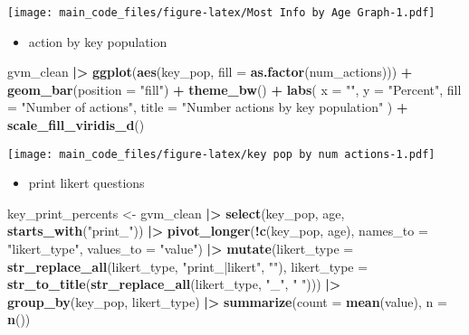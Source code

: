 \documentclass[
]{article}
\newenvironment{Shaded}{\begin{snugshade}}{\end{snugshade}}
\newcommand{\AttributeTok}[1]{\textcolor[rgb]{0.13,0.29,0.53}{#1}}
\newcommand{\FunctionTok}[1]{\textcolor[rgb]{0.13,0.29,0.53}{\textbf{#1}}}
\newcommand{\NormalTok}[1]{#1}
\newcommand{\OtherTok}[1]{\textcolor[rgb]{0.56,0.35,0.01}{#1}}
\newcommand{\SpecialCharTok}[1]{\textcolor[rgb]{0.81,0.36,0.00}{\textbf{#1}}}
\newcommand{\StringTok}[1]{\textcolor[rgb]{0.31,0.60,0.02}{#1}}
\providecommand{\tightlist}{%
  \setlength{\itemsep}{0pt}\setlength{\parskip}{0pt}}
\begin{document}
\texttt{[image: main\_code\_files/figure-latex/Most Info by Age Graph-1.pdf]}

\begin{itemize}
\tightlist
\item
  action by key population
\end{itemize}

\begin{Shaded}
\begin{Highlighting}[]
\NormalTok{gvm\_clean }\SpecialCharTok{|\textgreater{}}
  \FunctionTok{ggplot}\NormalTok{(}\FunctionTok{aes}\NormalTok{(key\_pop, }\AttributeTok{fill =} \FunctionTok{as.factor}\NormalTok{(num\_actions))) }\SpecialCharTok{+}
  \FunctionTok{geom\_bar}\NormalTok{(}\AttributeTok{position =} \StringTok{"fill"}\NormalTok{) }\SpecialCharTok{+}
  \FunctionTok{theme\_bw}\NormalTok{() }\SpecialCharTok{+}
  \FunctionTok{labs}\NormalTok{(}
    \AttributeTok{x =} \StringTok{""}\NormalTok{,}
    \AttributeTok{y =} \StringTok{"Percent"}\NormalTok{,}
    \AttributeTok{fill =} \StringTok{"Number of actions"}\NormalTok{,}
    \AttributeTok{title =} \StringTok{"Number actions by key population"}
\NormalTok{  ) }\SpecialCharTok{+}
  \FunctionTok{scale\_fill\_viridis\_d}\NormalTok{()}
\end{Highlighting}
\end{Shaded}

\texttt{[image: main\_code\_files/figure-latex/key pop by num actions-1.pdf]}

\begin{itemize}
\tightlist
\item
  print likert questions
\end{itemize}

\begin{Shaded}
\begin{Highlighting}[]
\NormalTok{key\_print\_percents }\OtherTok{\textless{}{-}}\NormalTok{ gvm\_clean }\SpecialCharTok{|\textgreater{}} 
  \FunctionTok{select}\NormalTok{(key\_pop, age, }\FunctionTok{starts\_with}\NormalTok{(}\StringTok{"print\_"}\NormalTok{)) }\SpecialCharTok{|\textgreater{}}
  \FunctionTok{pivot\_longer}\NormalTok{(}\SpecialCharTok{!}\FunctionTok{c}\NormalTok{(key\_pop, age), }\AttributeTok{names\_to =} \StringTok{"likert\_type"}\NormalTok{, }\AttributeTok{values\_to =} \StringTok{"value"}\NormalTok{) }\SpecialCharTok{|\textgreater{}}
  \FunctionTok{mutate}\NormalTok{(}\AttributeTok{likert\_type =} \FunctionTok{str\_replace\_all}\NormalTok{(likert\_type, }\StringTok{"print\_|likert"}\NormalTok{, }\StringTok{""}\NormalTok{),}
         \AttributeTok{likert\_type =} \FunctionTok{str\_to\_title}\NormalTok{(}\FunctionTok{str\_replace\_all}\NormalTok{(likert\_type, }\StringTok{"\_"}\NormalTok{, }\StringTok{" "}\NormalTok{))) }\SpecialCharTok{|\textgreater{}}
  \FunctionTok{group\_by}\NormalTok{(key\_pop, likert\_type) }\SpecialCharTok{|\textgreater{}}
  \FunctionTok{summarize}\NormalTok{(}\AttributeTok{count =} \FunctionTok{mean}\NormalTok{(value),}
            \AttributeTok{n =} \FunctionTok{n}\NormalTok{()) }
\end{Highlighting}
\end{Shaded}
\end{document}
